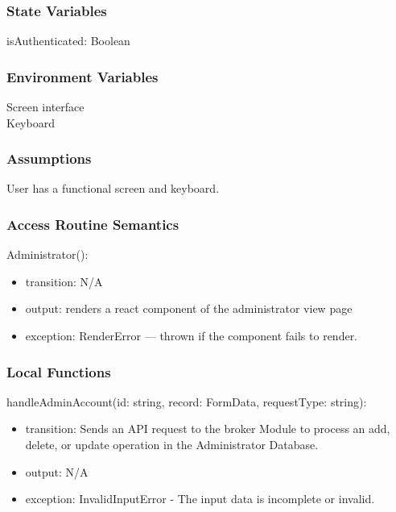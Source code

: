 \documentclass[12pt, titlepage]{article}
\begin{document}
\subsubsection{State Variables}
isAuthenticated: Boolean

\subsubsection{Environment Variables}
Screen interface\\
Keyboard\\

\subsubsection{Assumptions}
User has a functional screen and keyboard.

\subsubsection{Access Routine Semantics}

\noindent Administrator():
\begin{itemize}
\item transition: N/A
\item output: renders a react component of the administrator view page
\item exception: RenderError — thrown if the component fails to render.
\end{itemize}



\subsubsection{Local Functions}

\noindent handleAdminAccount(id: string, record: FormData, requestType: string):
\begin{itemize}
\item transition: Sends an API request to the broker Module to process an add, delete, or update operation in the Administrator Database.
\item output: N/A
\item exception: InvalidInputError - The input data is incomplete or invalid. 
\end{itemize} 
\end{document}
